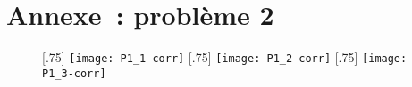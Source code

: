 \documentclass[a4paper, 10pt, garamond, oneside]{book}
\begin{document}
{	\newpage
	\chapter*{Annexe~: problème 2}

	\begin{figure}[htbp!]
		\centering
		[.75\linewidth]
		{\texttt{[image: P1\_1-corr]}}
		[.75\linewidth]
		{\texttt{[image: P1\_2-corr]}}
		[.75\linewidth]
		{\texttt{[image: P1\_3-corr]}}
		\caption{}
		\label{fig:gob}
	\end{figure}
}
\vspace{-20pt}
\end{document}
